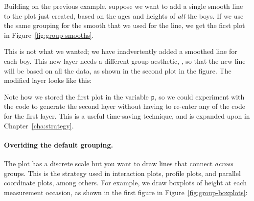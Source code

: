 Building on the previous example, suppose we want to add a single smooth line to the plot just created, based on the ages and heights of {\em all} the boys.  If we use the same grouping for the smooth that we used for the line, we get the first plot in Figure~\ref{fig:group-smooths}.  

% 


This is not what we wanted; we have inadvertently added a smoothed line for each boy. This new layer needs a different group aesthetic, , so that the new line will be based on all the data, as shown in the second plot in the figure.  The modified layer looks like this:

% 


% 

 
Note how we stored the first plot in the variable {\tt p}, so we could experiment with the code to generate the second layer without having to re-enter any of the code for the first layer.  This is a useful time-saving technique, and is expanded upon in Chapter~\ref{cha:strategy}.

\paragraph{Overiding the default grouping.}  The plot has a discrete scale but you want to draw lines that connect {\em across} groups.  This is the strategy used in interaction plots, profile plots, and parallel coordinate plots, among others.  For example, we draw boxplots of height at each measurement occasion, as shown in the first figure in Figure~\ref{fig:group-boxplots}:

% 


